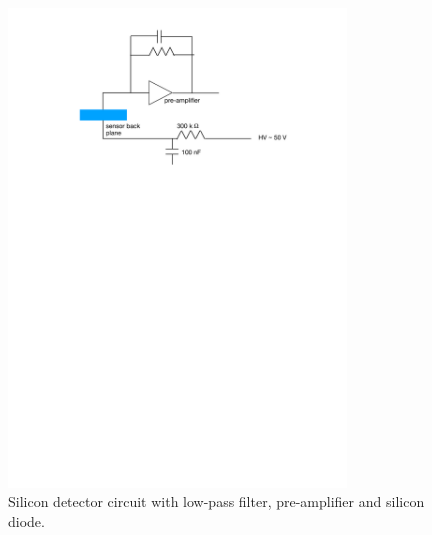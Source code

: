 \documentclass[12pt]{article}
\begin{document}
\begin{figure}[htb]
  \centering
  \includegraphics[width=0.8\textwidth]{./graphics/SiliconDiodeCircuit}
  \caption{Silicon detector circuit with low-pass filter, pre-amplifier and silicon diode.}
  \label{fig:SiliconDiodeCircuit}
\end{figure}




\end{document}
